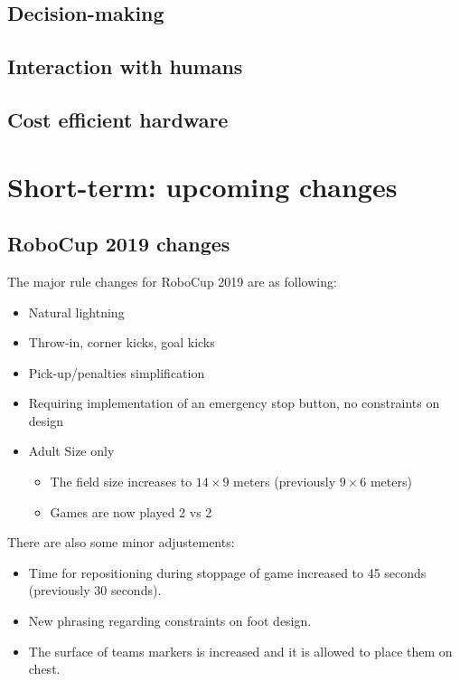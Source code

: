\documentclass{article}
\begin{document}
\subsection{Decision-making}

\subsection{Interaction with humans}

\subsection{Cost efficient hardware}

\section{\label{sec:ShortTerm}Short-term: upcoming changes}

\subsection{RoboCup 2019 changes}

The major rule changes for RoboCup 2019 are as following:

\begin{itemize}
\item Natural lightning
\item Throw-in, corner kicks, goal kicks %
\item Pick-up/penalties simplification
\item Requiring implementation of an emergency stop button, no constraints on design
\item Adult Size only
  \begin{itemize}
  \item The field size increases to $14 \times 9$ meters (previously $9 \times 6$ meters)
  \item Games are now played 2 vs 2
  \end{itemize}
\end{itemize}

There are also some minor adjustements:

\begin{itemize}
\item Time for repositioning during stoppage of game increased to 45 seconds (previously 30 seconds).
\item New phrasing regarding constraints on foot design.
\item The surface of teams markers is increased and it is allowed to place them on chest.
\end{itemize}
\end{document}
